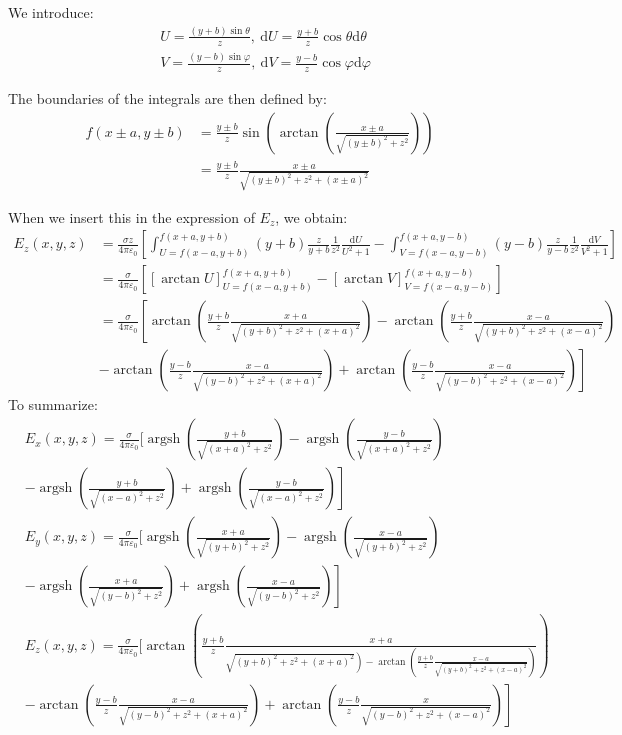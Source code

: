 \documentclass[12pt]{article}
\begin{document}
We introduce:
\[
\begin{aligned}
& U=\frac{(y+b) \sin \theta}{z}, \mathrm{~d} U=\frac{y+b}{z} \cos \theta \mathrm{d} \theta \\
& V=\frac{(y-b) \sin \varphi}{z}, \mathrm{~d} V=\frac{y-b}{z} \cos \varphi \mathrm{d} \varphi
\end{aligned}
\]

The boundaries of the integrals are then defined by:
\[
\begin{aligned}
f(x \pm a, y \pm b) & =\frac{y \pm b}{z} \sin \left(\arctan \left(\frac{x \pm a}{\sqrt{(y \pm b)^2+z^2}}\right)\right) \\
& =\frac{y \pm b}{z} \frac{x \pm a}{\sqrt{(y \pm b)^2+z^2+(x \pm a)^2}}
\end{aligned}
\]

When we insert this in the expression of \(E_z\), we obtain:
\[
\begin{aligned}
E_z(x, y, z) & =\frac{\sigma z}{4 \pi \varepsilon_0}\left[\int_{U=f(x-a, y+b)}^{f(x+a, y+b)}(y+b) \frac{z}{y+b} \frac{1}{z^2} \frac{\mathrm{d} U}{U^2+1}-\int_{V=f(x-a, y-b)}^{f(x+a, y-b)}(y-b) \frac{z}{y-b} \frac{1}{z^2} \frac{\mathrm{d} V}{V^2+1}\right] \\
& =\frac{\sigma}{4 \pi \varepsilon_0}\left[[\arctan U]_{U=f(x-a, y+b)}^{f(x+a, y+b)}-[\arctan V]_{V=f(x-a, y-b)}^{f(x+a, y-b)}\right] \\
& =\frac{\sigma}{4 \pi \varepsilon_0}\left[\arctan \left(\frac{y+b}{z} \frac{x+a}{\sqrt{(y+b)^2+z^2+(x+a)^2}}\right)-\arctan \left(\frac{y+b}{z} \frac{x-a}{\sqrt{(y+b)^2+z^2+(x-a)^2}}\right)\right. \\
& \left.-\arctan \left(\frac{y-b}{z} \frac{x-a}{\sqrt{(y-b)^2+z^2+(x+a)^2}}\right)+\arctan \left(\frac{y-b}{z} \frac{x-a}{\sqrt{(y-b)^2+z^2+(x-a)^2}}\right)\right]
\end{aligned}
\]
To summarize:
\[
\begin{aligned}
& E_x(x, y, z)=\frac{\sigma}{4 \pi \varepsilon_0}[ \operatorname{argsh}\left(\frac{y+b}{\sqrt{(x+a)^2+z^2}}\right)-\operatorname{argsh}\left(\frac{y-b}{\sqrt{(x+a)^2+z^2}}\right) \\
&\left.-\operatorname{argsh}\left(\frac{y+b}{\sqrt{(x-a)^2+z^2}}\right)+\operatorname{argsh}\left(\frac{y-b}{\sqrt{(x-a)^2+z^2}}\right)\right] \\
& E_y(x, y, z)=\frac{\sigma}{4 \pi \varepsilon_0}[ \operatorname{argsh}\left(\frac{x+a}{\sqrt{(y+b)^2+z^2}}\right)-\operatorname{argsh}\left(\frac{x-a}{\sqrt{(y+b)^2+z^2}}\right) \\
&\left.-\operatorname{argsh}\left(\frac{x+a}{\sqrt{(y-b)^2+z^2}}\right)+\operatorname{argsh}\left(\frac{x-a}{\sqrt{(y-b)^2+z^2}}\right)\right] \\
& E_z(x, y, z)=\frac{\sigma}{4 \pi \varepsilon_0}[ \arctan \left(\frac{y+b}{z} \frac{x+a}{\left.\sqrt{(y+b)^2+z^2+(x+a)^2}\right)-\arctan \left(\frac{y+b}{z} \frac{x-a}{\sqrt{(y+b)^2+z^2+(x-a)^2}}\right)}\right) \\
&\left.-\arctan \left(\frac{y-b}{z} \frac{x-a}{\sqrt{(y-b)^2+z^2+(x+a)^2}}\right)+\arctan \left(\frac{y-b}{z} \frac{x}{\sqrt{(y-b)^2+z^2+(x-a)^2}}\right)\right]
\end{aligned}
\]
\end{document}
